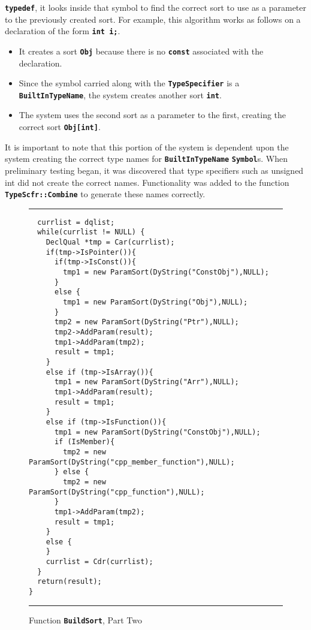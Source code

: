 \documentclass[12pt]{article} %
\newcommand{\reserved}[1]{\textbf{\texttt{#1}}} %
\newcommand{\UNSPACEFORBOX}{\vspace{-2ex}}
\newcommand{\HLINE}{\UNSPACEFORBOX%
\begin{flushleft}\rule{\textwidth}{0.01in}\end{flushleft}%
\UNSPACEFORBOX}
\newenvironment{BFIGURE}{

\begin{figure}
\small
\HLINE
}{
\HLINE
\normalsize
\end{figure}
}
\begin{document}
\reserved{typedef}, it looks inside that symbol to find the correct
sort to use as a parameter to the previously created sort. For
example, this algorithm works as follows on a declaration of the form
\reserved{int i;}.
\begin{itemize}
\item It creates a sort \reserved{Obj} because there is no
\reserved{const} associated with the declaration.
\item Since the symbol carried along with the \reserved{TypeSpecifier}
is a
\reserved{BuiltInTypeName}, the system creates another sort
\reserved{int}.
\item The system uses the second sort as a parameter to the first,
creating the correct sort \reserved{Obj[int]}.
\end{itemize}

It is important to note that this portion of the system is dependent
upon the system creating the correct type names for
\reserved{BuiltInTypeName} \reserved{Symbol}s. When preliminary testing began, it
was discovered that type specifiers such as {unsigned int} did not
create the correct names. Functionality was added to the function
\reserved{TypeScfr::Combine} to generate these names correctly. 

\begin{BFIGURE}
\small
\begin{verbatim}
  currlist = dqlist;
  while(currlist != NULL) {
    DeclQual *tmp = Car(currlist);
    if(tmp->IsPointer()){
      if(tmp->IsConst()){
        tmp1 = new ParamSort(DyString("ConstObj"),NULL);
      }
      else {
        tmp1 = new ParamSort(DyString("Obj"),NULL);
      }
      tmp2 = new ParamSort(DyString("Ptr"),NULL);
      tmp2->AddParam(result);
      tmp1->AddParam(tmp2);
      result = tmp1;
    }
    else if (tmp->IsArray()){
      tmp1 = new ParamSort(DyString("Arr"),NULL);
      tmp1->AddParam(result);
      result = tmp1;
    }
    else if (tmp->IsFunction()){
      tmp1 = new ParamSort(DyString("ConstObj"),NULL);
      if (IsMember){
        tmp2 = new ParamSort(DyString("cpp_member_function"),NULL);
      } else {
        tmp2 = new ParamSort(DyString("cpp_function"),NULL);
      }
      tmp1->AddParam(tmp2);
      result = tmp1;
    }
    else {
    }
    currlist = Cdr(currlist);
  }
  return(result);
}
\end{verbatim}
\normalsize
\caption{Function \reserved{BuildSort}, Part Two}
\label{buildsrttwo}
\end{BFIGURE}
\end{document}

